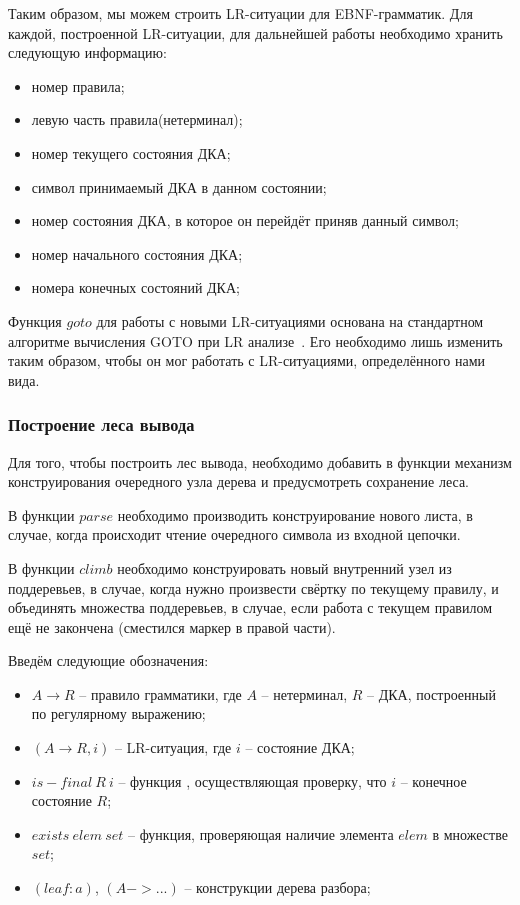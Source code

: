 Таким образом, мы можем строить LR-ситуации для EBNF-грамматик. Для каждой, построенной LR-ситуации, для дальнейшей работы необходимо хранить следующую информацию:
\begin{itemize}
  \item номер правила;
  \item левую часть правила(нетерминал);
  \item номер текущего состояния ДКА;
  \item символ принимаемый ДКА в данном состоянии;
  \item номер состояния ДКА, в которое он перейдёт приняв данный символ;
  \item номер начального состояния ДКА;
  \item номера конечных состояний ДКА;
\end{itemize}

Функция $goto$ для работы с новыми LR-ситуациями основана на стандартном алгоритме вычисления GOTO при LR анализе~\cite{DrgBook}. Его необходимо лишь изменить таким образом, чтобы он мог работать с LR-ситуациями, определённого нами вида. 

\subsubsection{Построение леса вывода}

Для того, чтобы построить лес вывода, необходимо добавить в функции механизм конструирования очередного узла дерева и предусмотреть сохранение леса.

В функции $parse$ необходимо производить конструирование нового листа, в случае, когда происходит чтение очередного символа из входной цепочки.

В функции $climb$ необходимо конструировать новый внутренний узел из поддеревьев, в случае, когда нужно произвести свёртку по текущему правилу, и объединять множества поддеревьев, в случае, если работа с текущем правилом ещё не закончена (сместился маркер в правой части).

Введём следующие обозначения:
\begin{itemize}
  \item $A \rightarrow R$ -- правило грамматики, где $A$ -- нетерминал, $R$ -- ДКА, построенный по регулярному выражению; 
  \item $(A \rightarrow R,i)$ -- LR-ситуация, где $i$ -- состояние ДКА;
  \item $is-final \ R \ i$ -- функция , осуществляющая проверку, что $i$ -- конечное состояние $R$;
  \item $exists \ elem \ set $ -- функция, проверяющая наличие элемента $elem$ в множестве $set$;
  \item $(leaf:a)$, $(A->...)$ -- конструкции дерева разбора;
\end{itemize} 


